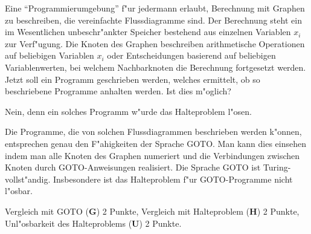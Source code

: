 Eine ``Programmierumgebung'' f"ur jedermann erlaubt, Berechnung mit
Graphen zu beschreiben, die vereinfachte Flussdiagramme sind.
Der Berechnung steht ein im Wesentlichen unbeschr"ankter Speicher
bestehend aus einzelnen Variablen $x_i$
zur Verf"ugung.
Die Knoten des Graphen beschreiben arithmetische Operationen auf beliebigen
Variablen $x_i$ oder Entscheidungen basierend auf beliebigen Variablenwerten,
bei welchem Nachbarknoten die Berechnung fortgesetzt werden.
Jetzt soll ein Programm geschrieben werden, welches ermittelt,
ob so beschriebene Programme anhalten werden.
Ist dies m"oglich?

\begin{loesung}
Nein, denn ein solches Programm  w"urde das Halteproblem l"osen.

Die Programme, die von solchen Flussdiagrammen beschrieben werden
k"onnen, entsprechen genau den F"ahigkeiten der Sprache GOTO.
Man kann dies einsehen indem man alle Knoten des Graphen numeriert und
die Verbindungen zwischen Knoten durch GOTO-Anweisungen realisiert.
Die Sprache GOTO ist Turing-vollst"andig.
Insbesondere ist das Halteproblem f"ur GOTO-Programme nicht l"osbar.
\end{loesung}

\begin{bewertung}
Vergleich mit GOTO ({\bf G}) 2 Punkte,
Vergleich mit Halteproblem ({\bf H}) 2 Punkte,
Unl"osbarkeit des Halteproblems ({\bf U}) 2 Punkte.
\end{bewertung}




